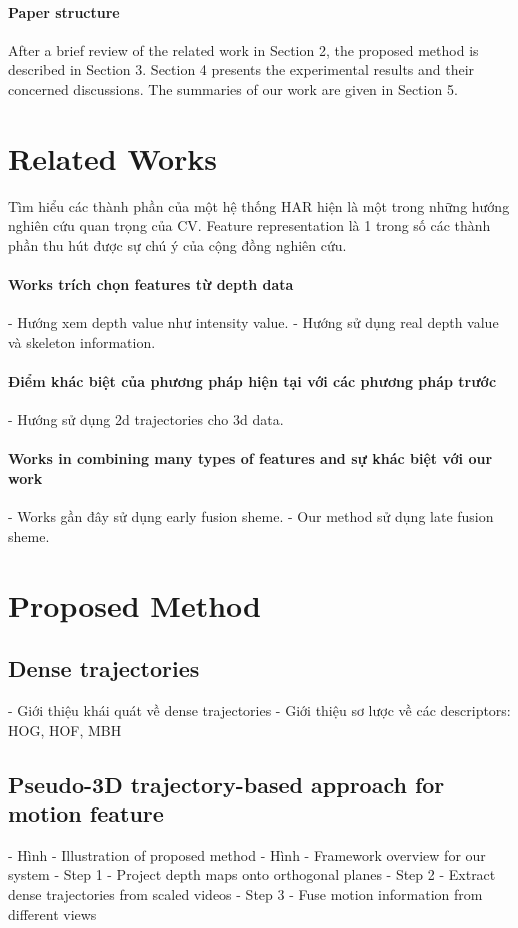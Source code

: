 \documentclass[review]{elsarticle}
\begin{document}
\paragraph{Paper structure}After a brief review of the related work in Section 2, the proposed method is described in Section 3. Section 4 presents the experimental results and their concerned discussions. The summaries of our work are given in Section 5.

\section{Related Works}

Tìm hiểu các thành phần của một hệ thống HAR hiện là một trong những hướng nghiên cứu quan trọng của CV.
Feature representation là 1 trong số các thành phần thu hút được sự chú ý của cộng đồng nghiên cứu.

\paragraph{Works trích chọn features từ depth data}
- Hướng xem depth value như intensity value.
- Hướng sử dụng real depth value và skeleton information.

\paragraph{Điểm khác biệt của phương pháp hiện tại với các phương pháp trước}
- Hướng sử dụng 2d trajectories cho 3d data.

\paragraph{Works in combining many types of features and sự khác biệt với our work}
- Works gần đây sử dụng early fusion sheme.
- Our method sử dụng late fusion sheme.

\section{Proposed Method}

\subsection{Dense trajectories}
- Giới thiệu khái quát về dense trajectories
- Giới thiệu sơ lược về các descriptors: HOG, HOF, MBH

\subsection{Pseudo-3D trajectory-based approach for motion feature}
- Hình - Illustration of proposed method
- Hình - Framework overview for our system
- Step 1 - Project depth maps onto orthogonal planes
- Step 2 - Extract dense trajectories from scaled videos
- Step 3 - Fuse motion information from different views
\end{document}
